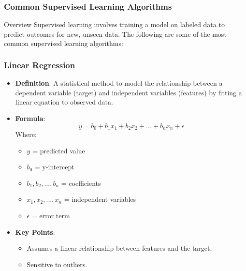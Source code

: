\documentclass{beamer}
\begin{document}
\begin{frame}[fragile]
    \frametitle{Common Supervised Learning Algorithms}
    \begin{block}{Overview}
        Supervised learning involves training a model on labeled data to predict outcomes for new, unseen data. 
        The following are some of the most common supervised learning algorithms:
    \end{block}
\end{frame}

\begin{frame}[fragile]
    \frametitle{Linear Regression}
    \begin{itemize}
        \item \textbf{Definition}: A statistical method to model the relationship between a dependent variable (target) and independent variables (features) by fitting a linear equation to observed data.
        \item \textbf{Formula}:
        \begin{equation}
        y = b_0 + b_1x_1 + b_2x_2 + ... + b_nx_n + \epsilon
        \end{equation}
        Where:
        \begin{itemize}
            \item $y$ = predicted value
            \item $b_0$ = y-intercept
            \item $b_1, b_2, ..., b_n$ = coefficients
            \item $x_1, x_2, ..., x_n$ = independent variables
            \item $\epsilon$ = error term
        \end{itemize}
        \item \textbf{Key Points}:
        \begin{itemize}
            \item Assumes a linear relationship between features and the target.
            \item Sensitive to outliers.
        \end{itemize}
    \end{itemize}
\end{frame}
\end{document}
